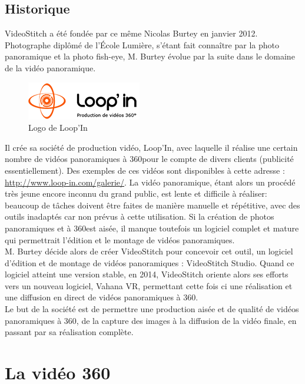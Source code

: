 \subsection{Historique}
VideoStitch a été fondée par ce même Nicolas Burtey en janvier 2012.\\
Photographe diplômé de l'École Lumière, s'étant fait connaître par la photo panoramique 
et la photo fish-eye, M. Burtey évolue par la suite dans le domaine de la vidéo panoramique.\\
\begin{figure}
  \centering
  \includegraphics[width=5cm]{images/loopin-logo.png}
  \caption{Logo de Loop'In}
\end{figure}
Il crée sa société de production vidéo, Loop'In, avec laquelle il réalise une 
certain nombre de vidéos panoramiques à 360\degree pour le compte de divers clients (publicité essentiellement). 
Des exemples de ces vidéos sont disponibles à cette adresse : \url{http://www.loop-in.com/galerie/}.
La vidéo panoramique, étant alors un procédé très jeune encore inconnu du grand public, est 
lente et difficile à réaliser: beaucoup de tâches doivent être faites de manière 
manuelle et répétitive, avec des outils inadaptés car non prévus à cette utilisation.
Si la création de photos panoramiques et à 360\degree est aisée, il manque toutefois 
un logiciel complet et mature qui permettrait l'édition et le montage de vidéos panoramiques.\\
\newline
M. Burtey décide alors de créer VideoStitch pour concevoir cet outil, un logiciel 
d'édition et de montage de vidéos panoramiques : VideoStitch Studio.
Quand ce logiciel atteint une version stable, en 2014, VideoStitch oriente alors 
ses efforts vers un nouveau logiciel, Vahana VR, permettant cette fois ci une réalisation 
et une diffusion en direct de vidéos panoramiques à 360\degree.\\
Le but de la société est de permettre une production aisée et de qualité de vidéos 
panoramiques à 360\degree, de la capture des images à la diffusion de la vidéo finale, 
en passant par sa réalisation complète.


\section{La vidéo 360}

